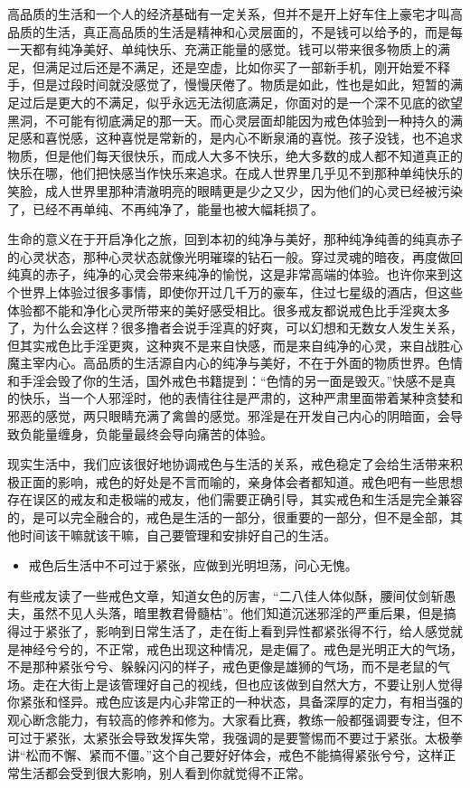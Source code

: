 高品质的生活和一个人的经济基础有一定关系，但并不是开上好车住上豪宅才叫高品质的生活，真正高品质的生活是精神和心灵层面的，不是钱可以给予的，而是每一天都有纯净美好、单纯快乐、充满正能量的感觉。钱可以带来很多物质上的满足，但满足过后还是不满足，还是空虚，比如你买了一部新手机，刚开始爱不释手，但是过段时间就没感觉了，慢慢厌倦了。物质是如此，性也是如此，短暂的满足过后是更大的不满足，似乎永远无法彻底满足，你面对的是一个深不见底的欲望黑洞，不可能有彻底满足的那一天。而心灵层面却能因为戒色体验到一种持久的满足感和喜悦感，这种喜悦是常新的，是内心不断泉涌的喜悦。孩子没钱，也不追求物质，但是他们每天很快乐，而成人大多不快乐，绝大多数的成人都不知道真正的快乐在哪，他们把快感当作快乐来追求。在成人世界里几乎见不到那种单纯快乐的笑脸，成人世界里那种清澈明亮的眼睛更是少之又少，因为他们的心灵已经被污染了，已经不再单纯、不再纯净了，能量也被大幅耗损了。

生命的意义在于开启净化之旅，回到本初的纯净与美好，那种纯净纯善的纯真赤子的心灵状态，那种心灵状态就像光明璀璨的钻石一般。穿过灵魂的暗夜，再度做回纯真的赤子，纯净的心灵会带来纯净的愉悦，这是非常高端的体验。也许你来到这个世界上体验过很多事情，即使你开过几千万的豪车，住过七星级的酒店，但这些体验都不能和净化心灵所带来的美好感受相比。很多戒友都说戒色比手淫爽太多了，为什么会这样？很多撸者会说手淫真的好爽，可以幻想和无数女人发生关系，但其实戒色比手淫更爽，这种爽不是来自快感，而是来自纯净的心灵，来自战胜心魔主宰内心。高品质的生活源自内心的纯净与美好，不在于外面的物质世界。色情和手淫会毁了你的生活，国外戒色书籍提到：“色情的另一面是毁灭。”快感不是真的快乐，当一个人邪淫时，他的表情往往是严肃的，这种严肃里面带着某种贪婪和邪恶的感觉，两只眼睛充满了禽兽的感觉。邪淫是在开发自己内心的阴暗面，会导致负能量缠身，负能量最终会导向痛苦的体验。

现实生活中，我们应该很好地协调戒色与生活的关系，戒色稳定了会给生活带来积极正面的影响，戒色的好处是不言而喻的，亲身体会者都知道。戒色吧有一些思想存在误区的戒友和走极端的戒友，他们需要正确引导，其实戒色和生活是完全兼容的，是可以完全融合的，戒色是生活的一部分，很重要的一部分，但不是全部，其他时间该干嘛就该干嘛，自己要管理和安排好自己的生活。

\begin{itemize}
    \item 戒色后生活中不可过于紧张，应做到光明坦荡，问心无愧。
\end{itemize}

有些戒友读了一些戒色文章，知道女色的厉害，“二八佳人体似酥，腰间仗剑斩愚夫，虽然不见人头落，暗里教君骨髓枯”。他们知道沉迷邪淫的严重后果，但是搞得过于紧张了，影响到日常生活了，走在街上看到异性都紧张得不行，给人感觉就是神经兮兮的，不正常，戒色出现这种情况，是走偏了。戒色是光明正大的气场，不是那种紧张兮兮、躲躲闪闪的样子，戒色更像是雄狮的气场，而不是老鼠的气场。走在大街上是该管理好自己的视线，但也应该做到自然大方，不要让别人觉得你紧张和怪异。戒色应该是内心非常正的一种状态，具备深厚的定力，有相当强的观心断念能力，有较高的修养和修为。大家看比赛，教练一般都强调要专注，但不可过于紧张，太紧张会导致发挥失常，我强调的是要警惕而不要过于紧张。太极拳讲“松而不懈、紧而不僵。”这个自己要好好体会，戒色不能搞得紧张兮兮，这样正常生活都会受到很大影响，别人看到你就觉得不正常。


